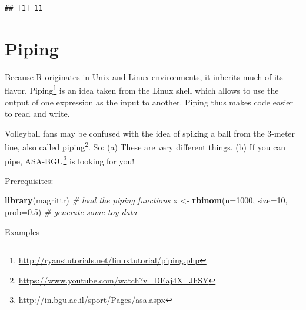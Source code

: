 \documentclass[]{book}
\newenvironment{Shaded}{\begin{snugshade}}{\end{snugshade}}
\newcommand{\CommentTok}[1]{\textcolor[rgb]{0.56,0.35,0.01}{\textit{#1}}}
\newcommand{\DataTypeTok}[1]{\textcolor[rgb]{0.13,0.29,0.53}{#1}}
\newcommand{\DecValTok}[1]{\textcolor[rgb]{0.00,0.00,0.81}{#1}}
\newcommand{\FloatTok}[1]{\textcolor[rgb]{0.00,0.00,0.81}{#1}}
\newcommand{\KeywordTok}[1]{\textcolor[rgb]{0.13,0.29,0.53}{\textbf{#1}}}
\newcommand{\NormalTok}[1]{#1}
\newcommand{\OperatorTok}[1]{\textcolor[rgb]{0.81,0.36,0.00}{\textbf{#1}}}
\newcommand{\StringTok}[1]{\textcolor[rgb]{0.31,0.60,0.02}{#1}}
\renewcommand{\href}[2]{#2\footnote{\url{#1}}}
\theoremstyle{definition}
\theoremstyle{definition}
\theoremstyle{definition}
\theoremstyle{remark}
\let\BeginKnitrBlock\begin \let\EndKnitrBlock\end
\begin{document}
\begin{verbatim}
## [1] 11
\end{verbatim}

\hypertarget{piping}{%
\section{Piping}\label{piping}}

Because R originates in Unix and Linux environments, it inherits much of its flavor.
\href{http://ryanstutorials.net/linuxtutorial/piping.php}{Piping} is an idea taken from the Linux shell which allows to use the output of one expression as the input to another.
Piping thus makes code easier to read and write.

\BeginKnitrBlock{remark}
{}Volleyball fans may be confused with the idea of spiking a ball from the 3-meter line, also called \href{https://www.youtube.com/watch?v=DEaj4X_JhSY}{piping}.
So:
(a) These are very different things.
(b) If you can pipe, \href{http://in.bgu.ac.il/sport/Pages/asa.aspx}{ASA-BGU} is looking for you!
\EndKnitrBlock{remark}

Prerequisites:

\begin{Shaded}
\begin{Highlighting}[]
\KeywordTok{library}\NormalTok{(magrittr) }\CommentTok{# load the piping functions}
\NormalTok{x <-}\StringTok{ }\KeywordTok{rbinom}\NormalTok{(}\DataTypeTok{n=}\DecValTok{1000}\NormalTok{, }\DataTypeTok{size=}\DecValTok{10}\NormalTok{, }\DataTypeTok{prob=}\FloatTok{0.5}\NormalTok{) }\CommentTok{# generate some toy data}
\end{Highlighting}
\end{Shaded}

Examples

\begin{Shaded}
\end{Shaded}
\end{document}

